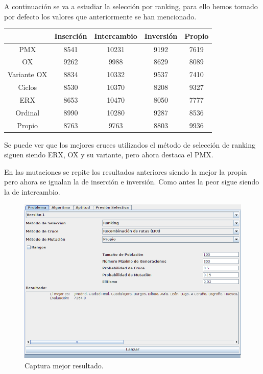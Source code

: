 \documentclass[12pt]{article}
\begin{document}
A continuación se va a estudiar la selección por ranking, para ello hemos tomado por defecto los valores que anteriormente se han mencionado.	

\begin{table}[H]
\begin{center}
\begin{tabular}{|ccccc|} \hline
	   & Inserción & Intercambio & Inversión & Propio \\  \hline
PMX 	   &  8541 & 10231 & 9192 & 7619 \\ 
OX 	   & 9262 & 9988 & 8629 & 8089  \\ 
Variante OX & 8834 & 10332 & 9537 & 7410 \\
Ciclos 	   & 8530 & 10370 & 8208 & 9327 \\
ERX 	   & 8653 & 10470 & 8050 & 7777 \\
Ordinal    & 8990 & 10280 & 9287 & 8536 \\
Propio     & 8763 & 9763 & 8803 & 9936 \\  \hline
\end{tabular}
\end{center}
\end{table}

	Se puede ver que los mejores cruces utilizados el método de selección de ranking siguen siendo ERX,
    OX y su variante, pero ahora destaca el PMX.

	En las mutaciones se repite los resultados anteriores siendo la mejor la propia pero ahora se
    igualan la de inserción e inversión. Como antes la peor sigue siendo la de intercambio.

\begin{figure}[H]
\centering
\includegraphics[scale=0.4]{graficas/fig2}
\caption{Captura mejor resultado.}
\end{figure}
\end{document}
